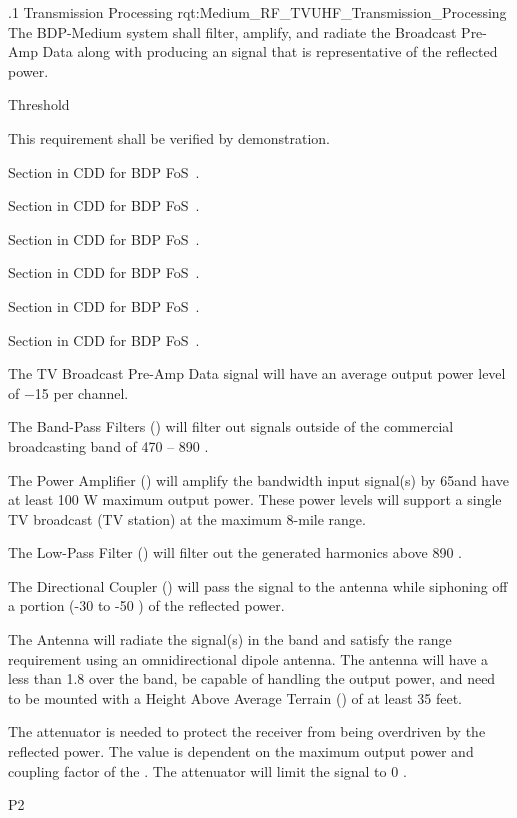 
\ONERQMTV
{\RqtNumberBase.1}
{\ThisSubSegment Transmission Processing}
{rqt:Medium_RF_TVUHF_Transmission_Processing}
{The BDP-Medium system shall filter, amplify, and radiate the \TVUHF \RF Broadcast Pre-Amp Data along with producing an \RF signal that is representative of the reflected \RF power.}
{
	\item [Phase 1]  Threshold
}
{This requirement shall be verified by demonstration.}
{
	\item [5.1.1] Section in CDD for BDP FoS~\cite{ref__BDP_FOS_CDD}.
	\item [5.1.2] Section in CDD for BDP FoS~\cite{ref__BDP_FOS_CDD}.
	\item [5.1.4] Section in CDD for BDP FoS~\cite{ref__BDP_FOS_CDD}.
	\item [5.5.1] Section in CDD for BDP FoS~\cite{ref__BDP_FOS_CDD}.
	\item [5.5.3] Section in CDD for BDP FoS~\cite{ref__BDP_FOS_CDD}.
	\item [5.5.4] Section in CDD for BDP FoS~\cite{ref__BDP_FOS_CDD}.
}
{
	\item The TV \RF Broadcast Pre-Amp Data signal will have an average output power level of −15 \dBm per \RF channel.
	\item The Band-Pass Filters (\BPF) will filter out signals outside of the commercial \FM broadcasting band of 470 – 890 \MHz.
	\item The \RF Power Amplifier (\PA) will amplify the \TVUHF bandwidth input signal(s) by 65\dB and have at least 100 W maximum output power. These power levels will support a single TV broadcast (TV station) at the maximum 8-mile range.
	\item The Low-Pass Filter (\LPF) will filter out the generated harmonics above 890 \MHz.
	\item The Directional Coupler (\DC) will pass the \RF signal to the antenna while siphoning off a portion (-30 to -50 \dB) of the reflected power.
	\item The Antenna will radiate the \RF signal(s) in the \TVUHF band and satisfy the range requirement using an omnidirectional dipole antenna. The antenna will have a \VSWR less than 1.8 over the \TVUHF band, be capable of handling the \PA output power, and need to be mounted with a Height Above Average Terrain (\HAAT) of at least 35 feet.
	\item The attenuator is needed to protect the receiver from being overdriven by the reflected power. The value is dependent on the maximum \PA output power and coupling factor of the \DC. The attenuator will limit the signal to 0 \dBm.
}
{P2}

